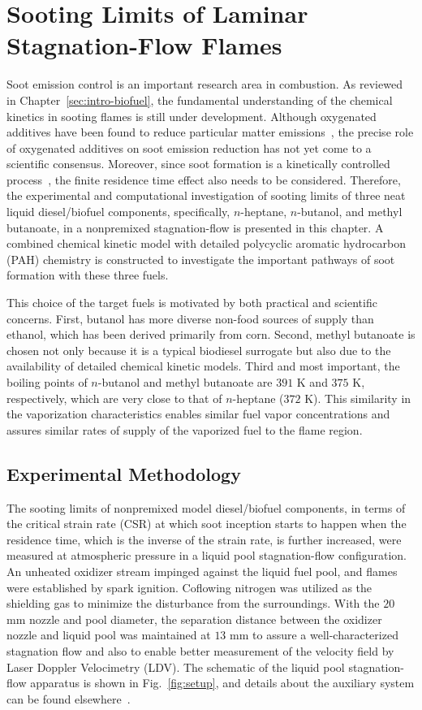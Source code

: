 \chapter{Sooting Limits of Laminar Stagnation-Flow Flames}\label{ch:biofuel}

Soot emission control is an important research area in combustion.  As reviewed in Chapter~\ref{sec:intro-biofuel}, the fundamental understanding of the chemical kinetics in sooting flames is still under development.  Although oxygenated additives have been found to reduce particular matter emissions~\cite{graboski98}, the precise role of oxygenated additives on soot emission reduction has not yet come to a scientific consensus.  Moreover, since soot formation is a kinetically controlled process~\cite{vandsburger85}, the finite residence time effect also needs to be considered.  Therefore, the experimental and computational investigation of sooting limits of three neat liquid diesel/biofuel components, specifically, $n$-heptane, $n$-butanol, and methyl butanoate, in a nonpremixed stagnation-flow is presented in this chapter.  A combined chemical kinetic model with detailed polycyclic aromatic hydrocarbon (PAH) chemistry is constructed to investigate the important pathways of soot formation with these three fuels.

This choice of the target fuels is motivated by both practical and scientific concerns. First, butanol has more diverse non-food sources of supply than ethanol, which has been derived primarily from corn. Second, methyl butanoate is chosen not only because it is a typical biodiesel surrogate but also due to the availability of detailed chemical kinetic models. Third and most important, the boiling points of $n$-butanol and methyl butanoate are $391$ K and $375$ K, respectively, which are very close to that of $n$-heptane ($372$ K). This similarity in the vaporization characteristics enables similar fuel vapor concentrations and assures similar rates of supply of the vaporized fuel to the flame region.

\section{Experimental Methodology}\label{sec:biofuel-exp}

The sooting limits of nonpremixed model diesel/biofuel components, in terms of the critical strain rate (CSR) at which soot inception starts to happen when the residence time, which is the inverse of the strain rate, is further increased, were measured at atmospheric pressure in a liquid pool stagnation-flow configuration. An unheated oxidizer stream impinged against the liquid fuel pool, and flames were established by spark ignition. Coflowing nitrogen was utilized as the shielding gas to minimize the disturbance from the surroundings.  With the $20$ mm nozzle and pool diameter, the separation distance between the oxidizer nozzle and liquid pool was maintained at $13$ mm to assure a well-characterized stagnation flow and also to enable better measurement of the velocity field by Laser Doppler Velocimetry (LDV).  The schematic of the liquid pool stagnation-flow apparatus is shown in Fig.~\ref{fig:setup}, and details about the auxiliary system can be found elsewhere~\cite{liu10}.

